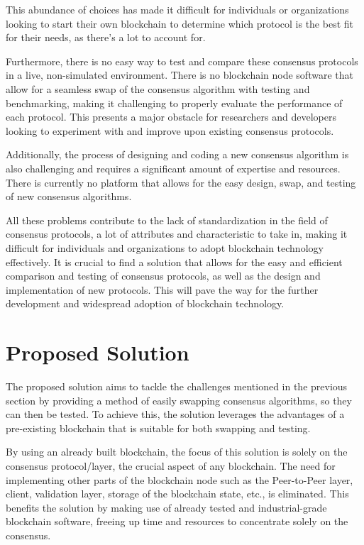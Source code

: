 This abundance of choices has made it difficult for individuals or organizations looking to start their own blockchain to determine which protocol is the best fit for their needs, as there's a lot to account for.

Furthermore, there is no easy way to test and compare these consensus protocols in a live, non-simulated environment.
There is no blockchain node software that allow for a seamless swap of the consensus algorithm with testing and benchmarking, making it challenging to properly evaluate the performance of each protocol. This presents a major obstacle for researchers and developers looking to experiment with and improve upon existing consensus protocols.

Additionally, the process of designing and coding a new consensus algorithm is also challenging and requires a significant amount of expertise and resources. There is currently no platform that allows for the easy design, swap, and testing of new consensus algorithms.

All these problems contribute to the lack of standardization in the field of consensus protocols, a lot of attributes and characteristic to take in, making it difficult for individuals and organizations to adopt blockchain technology effectively.
It is crucial to find a solution that allows for the easy and efficient comparison and testing of consensus protocols, as well as the design and implementation of new protocols. This will pave the way for the further development and widespread adoption of blockchain technology.


\section{Proposed Solution}
The proposed solution aims to tackle the challenges mentioned in the previous section by providing a method of easily swapping consensus algorithms, so they can then be tested. To achieve this, the solution leverages the advantages of a pre-existing blockchain that is suitable for both swapping and testing.

By using an already built blockchain, the focus of this solution is solely on the consensus protocol/layer, the crucial aspect of any blockchain. The need for implementing other parts of the blockchain node such as the Peer-to-Peer layer, client, validation layer, storage of the blockchain state, etc., is eliminated. This benefits the solution by making use of already tested and industrial-grade blockchain software, freeing up time and resources to concentrate solely on the consensus.

